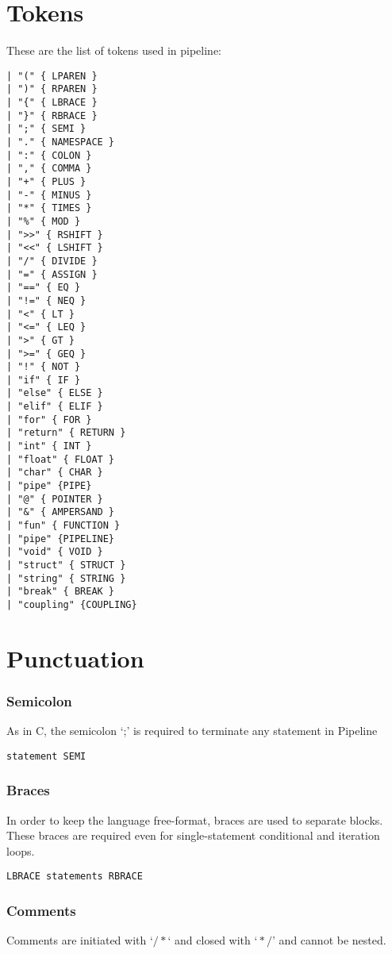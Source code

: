 \documentclass[./LRM_main.tex]{subfiles}
\begin{document}
\section{Tokens}
These are the list of tokens used in pipeline:\\
\begin{lstlisting}
| "(" { LPAREN } 
| ")" { RPAREN } 
| "{" { LBRACE } 
| "}" { RBRACE } 
| ";" { SEMI } 
| "." { NAMESPACE }
| ":" { COLON } 
| "," { COMMA } 
| "+" { PLUS } 
| "-" { MINUS }
| "*" { TIMES } 
| "%" { MOD } 
| ">>" { RSHIFT } 
| "<<" { LSHIFT } 
| "/" { DIVIDE } 
| "=" { ASSIGN } 
| "==" { EQ }
| "!=" { NEQ } 
| "<" { LT } 
| "<=" { LEQ } 
| ">" { GT } 
| ">=" { GEQ } 
| "!" { NOT } 
| "if" { IF } 
| "else" { ELSE } 
| "elif" { ELIF } 
| "for" { FOR } 
| "return" { RETURN } 
| "int" { INT }
| "float" { FLOAT } 
| "char" { CHAR }
| "pipe" {PIPE}
| "@" { POINTER } 
| "&" { AMPERSAND } 
| "fun" { FUNCTION } 
| "pipe" {PIPELINE}
| "void" { VOID } 
| "struct" { STRUCT } 
| "string" { STRING } 
| "break" { BREAK } 
| "coupling" {COUPLING}
\end{lstlisting}


\section{Punctuation}
\subsubsection{Semicolon}
As in C, the semicolon ‘;’ is required to terminate any statement in Pipeline
\begin{lstlisting}
statement SEMI
\end{lstlisting}

\subsubsection{Braces}
In order to keep the language free-format, braces are used to separate blocks. These braces are required even for single-statement conditional and iteration loops. 
\begin{lstlisting}
LBRACE statements RBRACE
\end{lstlisting}


\subsubsection{Comments }
Comments are initiated with $‘/* ‘$ and closed with $‘*/’$ and cannot be nested.
\end{document}
